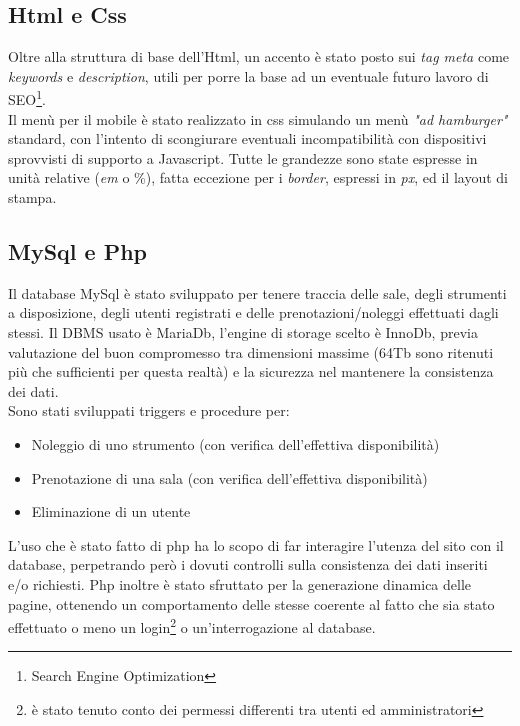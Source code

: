 \pagebreak

\subsection{Html e Css}
Oltre alla struttura di base dell'Html, un accento è stato posto sui \emph{tag meta} come \emph{keywords} e \emph{description}, utili per porre la base ad un eventuale futuro lavoro di SEO\footnote{Search Engine Optimization}. \\
Il menù per il mobile è stato realizzato in css simulando un menù \emph{"ad hamburger"} standard, con l'intento di scongiurare eventuali incompatibilità con dispositivi sprovvisti di supporto a Javascript. Tutte le grandezze sono state espresse in unità relative (\emph{em} o \%), fatta eccezione per i \emph{border}, espressi in \emph{px}, ed il layout di stampa.


\subsection{MySql e Php}
Il database MySql è stato sviluppato per tenere traccia delle sale, degli strumenti a disposizione, degli utenti registrati e delle prenotazioni/noleggi effettuati dagli stessi. Il DBMS usato è MariaDb, l'engine di storage scelto è InnoDb, previa valutazione del buon compromesso tra dimensioni massime (64Tb sono ritenuti più che sufficienti per questa realtà) e la sicurezza nel mantenere la consistenza dei dati.\\
Sono stati sviluppati triggers e procedure per:
\begin{itemize}
\item Noleggio di uno strumento (con verifica dell'effettiva disponibilità)
\item Prenotazione di una sala (con verifica dell'effettiva disponibilità)
\item Eliminazione di un utente
\end{itemize}
L'uso che è stato fatto di php ha lo scopo di far interagire l'utenza del sito con il database, perpetrando però i dovuti controlli sulla consistenza dei dati inseriti e/o richiesti. Php inoltre è stato sfruttato per la generazione dinamica delle pagine, ottenendo un comportamento delle stesse coerente al fatto che sia stato effettuato o meno un login\footnote{è stato tenuto conto dei permessi differenti tra utenti ed amministratori} o un'interrogazione al database.

